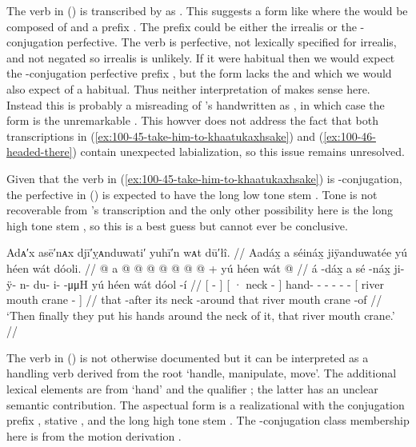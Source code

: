 The verb in (\lastx) is transcribed by \citeauthor{swanton:1909} as .
This suggests a form like  where the  would be composed of  and a prefix .
The  prefix could be either the irrealis or the -conjugation perfective.
The verb is perfective, not lexically specified for irrealis, and not negated so irrealis  is unlikely.
If it were habitual then we would expect the -conjugation perfective prefix , but the form lacks the  and  which we would also expect of a habitual.
Thus neither interpretation of  makes sense here.
Instead this is probably a misreading of \citeauthor{swanton:1909}’s handwritten  as , in which case the form is the unremarkable .
This howver does not address the fact that both transcriptions in (\ref{ex:100-45-take-him-to-khaatukaxhsake}) and (\ref{ex:100-46-headed-there}) contain unexpected labialization, so this issue remains unresolved.

Given that the verb in (\ref{ex:100-45-take-him-to-khaatukaxhsake}) is -conjugation, the perfective in (\lastx) is expected to have the long low tone  stem .
Tone is not recoverable from \citeauthor{swanton:1909}’s transcription and the only other possibility here is the long high tone  stem , so this is a best guess but cannot ever be conclusive.

\ex\label{ex:100-47-crane-neck}%
%
\begingl
	\glpreamble	Adᴀ′x asē′nᴀx djī′ỵᴀnduwati′ yuhī′n wᴀt dū′łî. //
	\glpreamble	Aadáx̱ a séináx̱ jiÿanduwatée yú héen wát dóoli. //
	\gla	{}  @ {} {}
		{} a  @ {} {}
		 @ {} @ {} @ {} @ {} @ {} @ {} +
		{} yú héen wát  @ {} {} //
	\glb	{} á -dáx̱ {}
		{} a sé -náx̱ {}
		ji- ÿ- n- du- i-  -μμH
		{} yú héen wát dóol -í {} //
	\glc	{}[  - {}]
		{}[ · neck - {}]
		hand- - - - -  -
		{}[  river mouth crane - {}] //
	\gld	{} that -after {}
		{} its neck -around {}
		 {} {} {} {} {} {}
		{} that river mouth crane -of {} //
	\glft	‘Then finally they put his hands around the neck of it, that river mouth crane.’
		//
\endgl
\xe

The verb  in (\lastx) is not otherwise documented but it can be interpreted as a handling verb derived from the root  ‘handle, manipulate, move’.
The additional lexical elements are  from  ‘hand’ and the qualifier ; the latter has an unclear semantic contribution.
The aspectual form is a realizational with the conjugation prefix , stative , and the long high tone stem .
The -conjugation class membership here is from the motion derivation .

